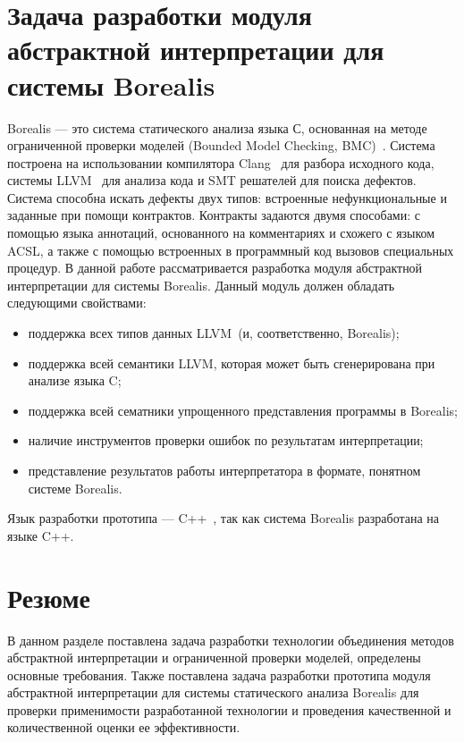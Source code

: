 \section{Задача разработки модуля абстрактной интерпретации для системы 
Borealis}
Borealis --- это система статического анализа языка С, основанная на методе 
ограниченной проверки моделей (Bounded Model Checking, BMC)~\cite{bmc}. Система 
построена на использовании компилятора Clang~\cite{clang} для разбора исходного 
кода, системы LLVM~\cite{llvm} для анализа кода и SMT решателей для поиска 
дефектов. Система способна искать дефекты двух типов: встроенные 
нефункциональные и заданные при помощи контрактов. Контракты задаются двумя 
способами: с помощью языка аннотаций, основанного на комментариях и схожего с 
языком ACSL, а также с помощью встроенных в программный код вызовов специальных 
процедур. В данной работе рассматривается разработка модуля абстрактной 
интерпретации для системы Borealis. Данный модуль должен обладать следующими
свойствами:
\begin{itemize}
\item поддержка всех типов данных LLVM~(и, соответственно, Borealis);
\item поддержка всей семантики LLVM, которая может быть сгенерирована при 
анализе языка C;
\item поддержка всей сематники упрощенного представления программы в Borealis;
\item наличие инструментов проверки ошибок по результатам интерпретации;
\item представление результатов работы интерпретатора в формате, понятном 
системе Borealis.
\end{itemize}

Язык разработки прототипа --- C++~\cite{languageC++}, так как система Borealis 
разработана на языке C++.

\section{Резюме}
В данном разделе поставлена задача разработки технологии объединения методов
абстрактной интерпретации и ограниченной проверки моделей, определены основные 
требования. Также поставлена задача разработки прототи­па модуля абстрактной
интерпретации для системы статического анализа Borealis для проверки 
применимости разработанной технологии и про­ведения качественной и 
количественной оценки ее эффективности.